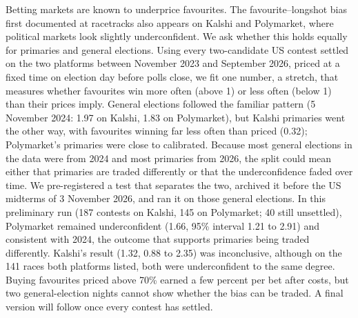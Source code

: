 Betting markets are known to underprice favourites. The favourite--longshot bias first documented at racetracks also
appears on Kalshi and Polymarket, where political markets look slightly underconfident. We ask whether this holds
equally for primaries and general elections. Using every two-candidate US contest settled on the two platforms between
November 2023 and September 2026, priced at a fixed time on election day before polls close, we fit one number, a
stretch, that measures whether favourites win more often (above 1) or less often (below 1) than their prices imply.
General elections followed the familiar pattern (5 November 2024: 1.97 on Kalshi, 1.83 on Polymarket), but Kalshi
primaries went the other way, with favourites winning far less often than priced (0.32); Polymarket's primaries were
close to calibrated. Because most general elections in the data were from 2024 and most primaries from 2026, the split
could mean either that primaries are traded differently or that the underconfidence faded over time. We pre-registered
a test that separates the two, archived it before the US midterms of 3 November 2026, and ran it on those general
elections. In this preliminary run (187 contests on Kalshi, 145 on Polymarket; 40 still unsettled), Polymarket remained
underconfident (1.66, 95\% interval 1.21 to 2.91) and consistent with 2024, the outcome that supports primaries being
traded differently. Kalshi's result (1.32, 0.88 to 2.35) was inconclusive, although on the 141 races both platforms
listed, both were underconfident to the same degree. Buying favourites priced above 70\% earned a few percent per bet after
costs, but two general-election nights cannot show whether the bias can be traded. A final version will follow once
every contest has settled.
